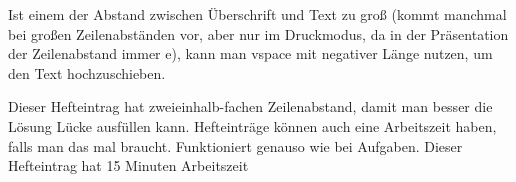 {
    \ifbeamer\else\vspace{-0.6cm}\fi
    
    Ist einem der Abstand zwischen Überschrift und Text zu groß (kommt manchmal bei großen Zeilenabständen vor, aber nur im Druckmodus, da in der Präsentation der Zeilenabstand immer e), kann man vspace mit negativer Länge nutzen, um den Text hochzuschieben.

    Dieser Hefteintrag hat zweieinhalb-fachen Zeilenabstand, damit man besser die Lösung Lücke ausfüllen kann. Hefteinträge können auch eine Arbeitszeit haben, falls man das mal braucht. Funktioniert genauso wie bei Aufgaben. Dieser Hefteintrag hat 15 Minuten Arbeitszeit
}